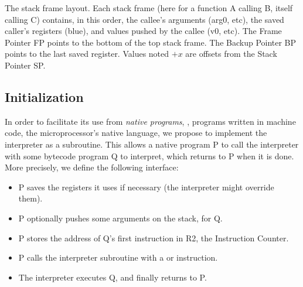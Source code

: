 \begin{Figure}
  

  \caption{The stack frame layout. Each stack frame (here for a function A
  calling B, itself calling C) contains, in this order, the callee's arguments
  (arg0, etc), the saved caller's registers (blue), and values pushed by the
  callee (v0, etc). The Frame Pointer FP points to the bottom of the top stack
  frame. The Backup Pointer BP points to the last saved register. Values noted
  $+x$ are offsets from the Stack Pointer SP.}\label{fig:stack-frame-layout}
\end{Figure}

\subsection{Initialization}\label{sec:interpreter-init}

In order to facilitate its use from {\em native programs}, \ie, programs
written in machine code, the microprocessor's native language, we propose to
implement the interpreter as a subroutine. This allows a native program P to
call the interpreter with some bytecode program Q to interpret, which returns
to P when it is done. More precisely, we define the following interface:
\begin{itemize}
  \item P saves the registers it uses if necessary (the interpreter might
  override them).

  \item P optionally pushes some arguments on the stack, for Q.

  \item P stores the address of Q's first instruction in R2, the Instruction
  Counter.

  \item P calls the interpreter subroutine with a  or 
  instruction.

  \item The interpreter executes Q, and finally returns to P.
\end{itemize}

